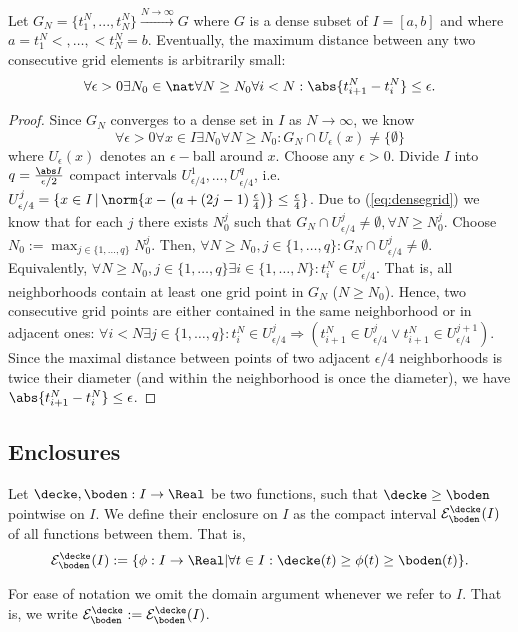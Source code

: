\begin{lem} \label{lem:densegridmaxdist}
Let $G_N = \{t_1^N,...,t_N^N \} \stackrel{N \to \infty }{\longrightarrow} G$ where $G$ is a dense subset of $I=[a,b]$ and where $a=t_1^N<,\ldots,<t_N^N=b$. 
Eventually, the maximum distance between any two consecutive grid elements is arbitrarily small:
\[ \forall \epsilon >0 \exists N_0 \in \nat \forall N\geq N_0 \forall i <N: \abs{t_{i+1}^N - t_i^N} \leq \epsilon.\]
\begin{proof}
Since $G_N$ converges to a dense set in $I$ as $N \to \infty$, we know
\begin{equation}\label{eq:densegrid}
 \forall \epsilon >0 \forall x \in I \exists N_0 \forall N\geq N_0: G_N \cap U_\epsilon(x) \neq \{\emptyset\} 
\end{equation}
where $U_\epsilon(x)$ denotes an $\epsilon -$ball around $x$.
Choose any $\epsilon >0$. Divide $I$ into $q =  \frac{\abs I}{\epsilon/2}$ compact intervals $U^1_{\epsilon/4},\ldots,U^q_{\epsilon/4}$, i.e. $U^j_{\epsilon/4} = \{x \in I \,|\, \norm{x - \bigl(a+(2j-1)\,\frac{\epsilon}{4}\bigr)  } \leq \frac{\epsilon}{4} \}$.
Due to (\ref{eq:densegrid}) we know that for each $j$ there exists $N_0^j$ such that $G_N \cap U^j_{\epsilon/4} \neq \emptyset, \forall N \geq N_0^j$. Choose $N_0 := \max_{j \in \{1,\ldots,q\}} N^j_0$.
Then, $\forall N \geq N_0,j \in \{1,\ldots,q\}: G_N \cap U^j_{\epsilon/4} \neq \emptyset  $. 
Equivalently, $\forall N \geq N_0,j \in \{1,\ldots,q\}\exists i \in \{1,\ldots, N\}: t^N_i \in U^j_{\epsilon/4}$. That is, all neighborhoods contain at least one grid point in $G_N$ ($N \geq N_0$). Hence, two consecutive grid points are either contained in the same neighborhood or in adjacent ones: 
$\forall i <N \exists j \in \{1,\ldots,q\}:  t^N_i \in U^j_{\epsilon/4} \Rightarrow (t^N_{i+1} \in U^j_{\epsilon/4} \vee t^N_{i+1} \in U^{j+1}_{\epsilon/4})$. 
Since the maximal distance between points of two adjacent $\epsilon/4$ neighborhoods is twice their diameter (and within the neighborhood is once the diameter), we have $ \abs{t_{i+1}^N - t_i^N} \leq \epsilon$.

\end{proof}

\end{lem}


\subsection{Enclosures}
\label{sec:enclosures}

\begin{defn}[Enclosure]
Let $\decke,\boden: I \to \Real$ be two functions, such that $\decke
\geq \boden$ pointwise on $I$. We define their enclosure on $I$ as
the compact interval $\mathcal E^\decke_\boden (I)$ of all functions
between them. That is, \[\mathcal E^\decke_\boden (I) := \{\phi: I
\to \Real \vert \forall t \in I: \decke(t) \geq \phi(t) \geq
\boden(t) \}.\]
\end{defn}
For ease of notation we omit the domain argument whenever we refer
to $I$. That is, we write  $\mathcal E^\decke_\boden :=\mathcal
E^\decke_\boden (I)$.

